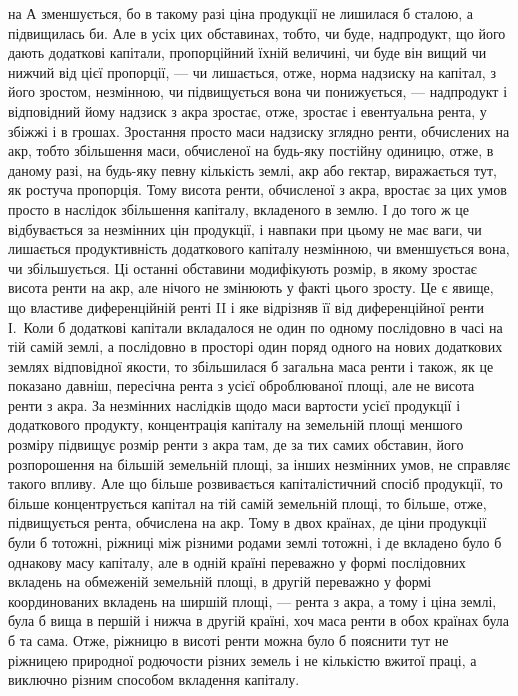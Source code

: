 \parcont{}  %
на А зменшується, бо в такому разі ціна продукції не лишилася б сталою,
а підвищилась би. Але в усіх цих обставинах, тобто, чи буде, надпродукт, що
його дають додаткові капітали, пропорційний їхній величині, чи буде він
вищий чи нижчий від цієї пропорції, — чи лишається, отже, норма надзиску на
капітал, з його зростом, незмінною, чи підвищується вона чи понижується, —
надпродукт і відповідний йому надзиск з акра зростає, отже, зростає і
евентуальна рента, у збіжжі і в грошах. Зростання просто маси надзиску зглядно
ренти, обчислених на акр, тобто збільшення маси, обчисленої на будь-яку постійну
одиницю, отже, в даному разі, на будь-яку певну кількість землі, акр або гектар,
виражається тут, як ростуча пропорція. Тому висота ренти, обчисленої з акра,
вростає за цих умов просто в наслідок збільшення капіталу, вкладеного в землю.
І до того ж це відбувається за незмінних цін продукції, і навпаки при цьому
не має ваги, чи лишається продуктивність додаткового капіталу незмінною, чи
вменшується вона, чи збільшується. Ці останні обставини модифікують розмір,
в якому зростає висота ренти на акр, але нічого не змінюють у факті цього
зросту. Це є явище, що властиве диференційній ренті II і яке відрізняв її від
диференційної ренти І.~Коли б додаткові капітали вкладалося не один по
одному послідовно в часі на тій самій землі, а послідовно в просторі один
поряд одного на нових додаткових землях відповідної якости, то збільшилася б
загальна маса ренти і також, як це показано давніш, пересічна рента з усієї
оброблюваної площі, але не висота ренти з акра. За незмінних наслідків щодо
маси вартости усієї продукції і додаткового продукту, концентрація капіталу на
земельній площі меншого розміру підвищує розмір ренти з акра там, де за тих
самих обставин, його розпорошення на більшій земельній площі, за інших незмінних
умов, не справляє такого впливу. Але що більше розвивається капіталістичний
спосіб продукції, то більше концентрується капітал на тій самій земельній
площі, то більше, отже, підвищується рента, обчислена на акр. Тому в
двох країнах, де ціни продукції були б тотожні, ріжниці між різними родами
землі тотожні, і де вкладено було б однакову масу капіталу, але в одній країні
переважно у формі послідовних вкладень на обмеженій земельній площі, в другій
переважно у формі координованих вкладень на ширшій площі, — рента з акра, а
тому і ціна землі, була б вища в першій і нижча в другій країні, хоч маса
ренти в обох країнах була б та сама. Отже, ріжницю в висоті ренти можна
було б пояснити тут не ріжницею природної родючости різних земель і не
кількістю вжитої праці, а виключно різним способом вкладення капіталу.

